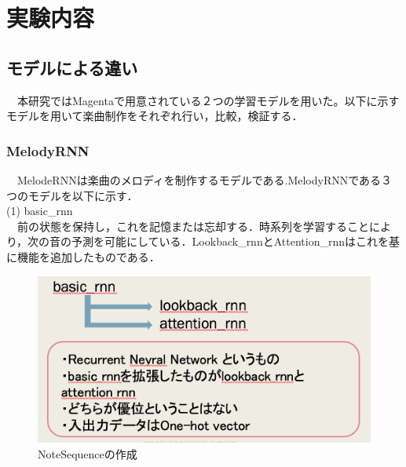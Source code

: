 \chapter{実験内容}
\section{モデルによる違い}
　本研究ではMagentaで用意されている２つの学習モデルを用いた。以下に示すモデルを用いて楽曲制作をそれぞれ行い，比較，検証する．\\

\subsection{MelodyRNN}
　MelodeRNNは楽曲のメロディを制作するモデルである.MelodyRNNである３つのモデルを以下に示す．\\
(1) basic\_rnn\\
　前の状態を保持し，これを記憶または忘却する．時系列を学習することにより，次の音の予測を可能にしている．Lookback\_rnnとAttention\_rnnはこれを基に機能を追加したものである．\\
\begin{figure}[!ht]
    \begin{screen}
    \begin{center}
        \includegraphics[scale=0.8, clip]{./img/basic1.png}
        \caption{NoteSequenceの作成}
        \label{fig:NoteSequenceの作成}
    \end{center}
    \end{screen}
\end{figure} \\

